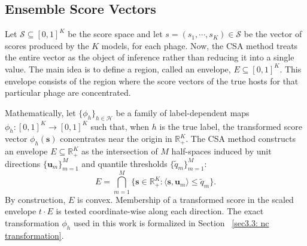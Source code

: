 \subsection{Ensemble Score Vectors}
\label{sec2.4.1: ensemble score vectors}
Let $\mathcal{S} \subseteq [0, 1]^K$ be the score space and let $s = (s_1, \cdots, s_K) \in \mathcal{S}$ be 
the vector of scores produced by the $K$ models, for each phage. Now, the CSA method treats the entire vector as the 
object of inference rather than reducing it into a single value. The main idea is to define a region, called an envelope, 
$E \subseteq [0,1]^K$. This envelope consists of the region where the score vectors of the true hosts for that particular 
phage are concentrated.


Mathematically, let $\{\phi_h\}_{h\in\mathcal{H}}$ be a family of label-dependent maps 
$\phi_h: [0,1]^K \to [0,1]^K$ such that, when $h$ is the true label, the transformed 
score vector $\phi_h(\mathbf{s})$ concentrates near the origin in $\mathbb{R}^K_+$. 
The CSA method constructs an envelope $E \subseteq \mathbb{R}^K_+$ as the intersection 
of $M$ half-spaces induced by unit directions $\{\mathbf{u}_m\}_{m=1}^M$ and quantile 
thresholds $\{\tilde{q}_m\}_{m=1}^M$:
\begin{equation}
\label{eq: convex envelope}
E = \bigcap_{m=1}^{M} \bigl\{\mathbf{s} \in \mathbb{R}^K_+ : \langle \mathbf{s}, \mathbf{u}_m \rangle \leq \tilde{q}_m \bigr\}.
\end{equation}
By construction, $E$ is convex. Membership of a transformed score in the scaled envelope 
$t \cdot E$ is tested coordinate-wise along each direction. The exact transformation 
$\phi_h$ used in this work is formalized in Section~ \ref{sec3.3: nc transformation}.


